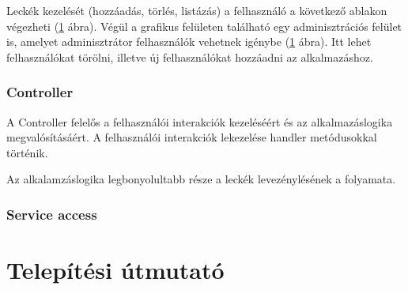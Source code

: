 \documentclass[a4paper]{article}
\begin{document}
     Leckék kezelését (hozzáadás, törlés, listázás) a felhasználó a következő ablakon végezheti (\ref{} ábra).
     Végül a grafikus felületen található egy adminisztrációs felület is, amelyet adminisztrátor felhasználók vehetnek igénybe (\ref{} ábra). Itt lehet felhasználókat törölni, illetve új felhasználókat hozzáadni az alkalmazáshoz.
   
     \subsubsection{Controller}
     A Controller felelős a felhasználói interakciók kezeléséért és az alkalmazáslogika megvalósításáért. A felhasználói interakciók lekezelése handler metódusokkal történik.
     
     Az alkalamzáslogika legbonyolultabb része a leckék levezénylésének a folyamata.
     \subsubsection{Service access}
     
    \section{Telepítési útmutató}
    
    
\end{document}

